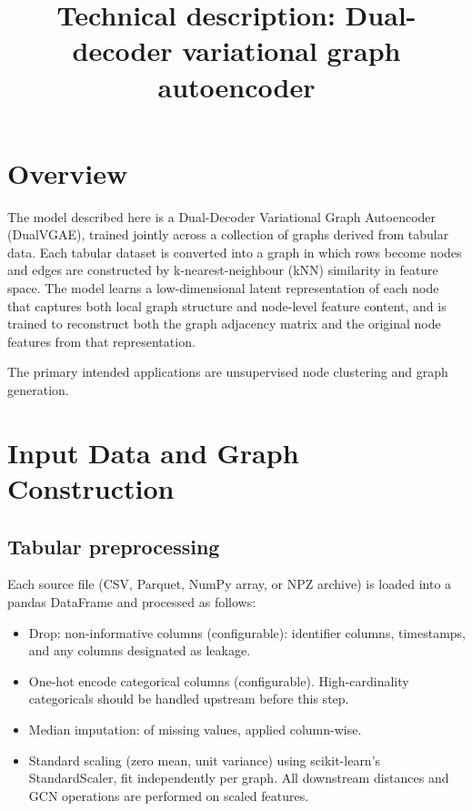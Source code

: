 \documentclass[11pt]{article}
\title{Technical description: Dual-decoder variational graph
autoencoder}
\author{}
\date{}
\begin{document}

\section{Overview}
The model described here is a Dual-Decoder Variational Graph
Autoencoder (DualVGAE), trained jointly across a collection of
graphs derived from tabular data. Each tabular dataset is
converted into a graph in which rows become nodes and edges are
constructed by k-nearest-neighbour (kNN) similarity in feature
space. The model learns a low-dimensional latent representation
of each node that captures both local graph structure and
node-level feature content, and is trained to reconstruct both
the graph adjacency matrix and the original node features from
that representation.

The primary intended applications are unsupervised node
clustering and graph generation.


\section{Input Data and Graph Construction}

\subsection{Tabular preprocessing}

Each source file (CSV, Parquet, NumPy array, or NPZ archive) is loaded
into a pandas DataFrame and processed as follows:
\begin{itemize}
\item Drop: non-informative columns (configurable): identifier
      columns, timestamps, and any columns designated as leakage.
\item One-hot encode categorical columns
      (configurable). High-cardinality categoricals should be handled
      upstream before this step.
\item Median imputation: of missing values, applied column-wise.
\item Standard scaling (zero mean, unit variance) using
      scikit-learn's StandardScaler, fit independently per graph. All
      downstream distances and GCN operations are performed on scaled
      features.
\end{itemize}
      
\end{document}
